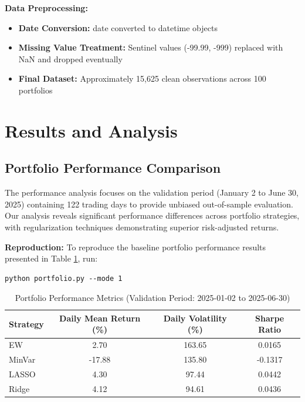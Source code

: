 \documentclass[12pt]{article}
\begin{document}
\textbf{Data Preprocessing:}
\begin{itemize}
    \item \textbf{Date Conversion:} date converted to datetime objects
    \item \textbf{Missing Value Treatment:} Sentinel values (-99.99, -999) replaced with NaN and dropped eventually
    \item \textbf{Final Dataset:} Approximately 15,625 clean observations across 100 portfolios
\end{itemize}

\section{Results and Analysis}

\subsection{Portfolio Performance Comparison}
The performance analysis focuses on the validation period (January 2 to June 30, 2025) containing 122 trading days to provide unbiased out-of-sample evaluation. Our analysis reveals significant performance differences across portfolio strategies, with regularization techniques demonstrating superior risk-adjusted returns.

\textbf{Reproduction:}
To reproduce the baseline portfolio performance results presented in Table \ref{tab:performance}, run:
\begin{lstlisting}
python portfolio.py --mode 1
\end{lstlisting}

\begin{table}[H]
\centering
\caption{Portfolio Performance Metrics (Validation Period: 2025-01-02 to 2025-06-30)}
\label{tab:performance}
\begin{tabular}{lccc}
\toprule
Strategy & Daily Mean Return (\%) & Daily Volatility (\%) & Sharpe Ratio \\
\midrule
EW & 2.70 & 163.65 & 0.0165 \\
MinVar & -17.88 & 135.80 & -0.1317 \\
LASSO & 4.30 & 97.44 & 0.0442 \\
Ridge & 4.12 & 94.61 & 0.0436 \\
\bottomrule
\end{tabular}
\end{table}
\end{document}
